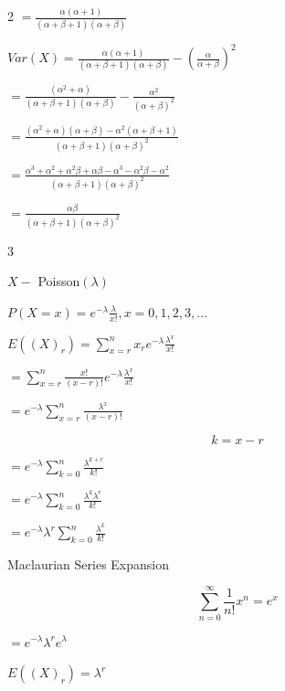 \documentclass[12 pt]{article}
\begin{document}
\begin{exercise}{2}
    $= \frac{\alpha (\alpha + 1)}{(\alpha + \beta + 1)(\alpha + \beta)}$

    \hfill

    $Var(X) = \frac{\alpha (\alpha + 1)}{(\alpha + \beta + 1)(\alpha + \beta)} - (\frac{\alpha}{\alpha + \beta})^2$

    $= \frac{({\alpha}^2 + \alpha)}{(\alpha + \beta + 1)(\alpha + \beta)} - \frac{{\alpha}^2}{(\alpha + \beta)^2}$

    $= \frac{({\alpha}^2 + \alpha)(\alpha + \beta) - {\alpha}^2 (\alpha + \beta + 1)}{(\alpha + \beta + 1)(\alpha + \beta)^2}$

    $= \frac{{\alpha}^3 + {\alpha}^2 + {\alpha}^2 \beta + \alpha \beta - {\alpha}^3 - {\alpha}^2 \beta - {\alpha}^2}{(\alpha + \beta + 1)(\alpha + \beta)^2}$

    $= \frac{\alpha \beta}{(\alpha + \beta + 1)(\alpha + \beta)^2}$

    \hfill
    \end{exercise}



    \begin{exercise}{3}
    \hfill

    $X -$ Poisson$(\lambda)$

    $P(X = x) = e^{- \lambda} \frac{\lambda}{x!}, x = 0, 1, 2, 3, ...$

    \hfill

    $E((X)_r) = \sum_{x=r}^{n} x_r e^{- \lambda} \frac{{\lambda}^x}{x!}$

    $= \sum_{x=r}^{n} \frac{x!}{(x-r)!} e^{- \lambda} \frac{{\lambda}^x}{x!}$

    $= e^{- \lambda} \sum_{x=r}^{n} \frac{{\lambda}^x}{(x-r)!}$

    $$k = x-r$$

    $= e^{- \lambda} \sum_{k=0}^{n} \frac{{\lambda}^{k+r}}{k!}$

    $= e^{- \lambda} \sum_{k=0}^{n} \frac{{\lambda}^k {\lambda}^r}{k!}$

    $= e^{- \lambda} {\lambda}^r \sum_{k=0}^{n} \frac{{\lambda}^k}{k!}$

    Maclaurian Series Expansion
    
    $$\sum_{n=0}^{\infty} \frac{1}{n!} x^n = e^x$$

    $= e^{- \lambda} {\lambda}^r e^{\lambda}$

    $E((X)_r) = {\lambda}^r$

    \hfill
    \end{exercise}
\end{document}
